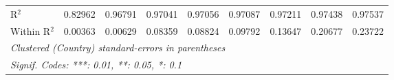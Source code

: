\begin{table}[htbp]
\begin{tabular}{lcccccccc}
      R$^2$                                                     & 0.82962  & 0.96791  & 0.97041  & 0.97056  & 0.97087  & 0.97211  & 0.97438        & 0.97537\\  
      Within R$^2$                                              & 0.00363  & 0.00629  & 0.08359  & 0.08824  & 0.09792  & 0.13647  & 0.20677        & 0.23722\\  
      \midrule \midrule
      \multicolumn{9}{l}{\emph{Clustered (Country) standard-errors in parentheses}}\\
      \multicolumn{9}{l}{\emph{Signif. Codes: ***: 0.01, **: 0.05, *: 0.1}}\\
   \end{tabular}
\end{table}


